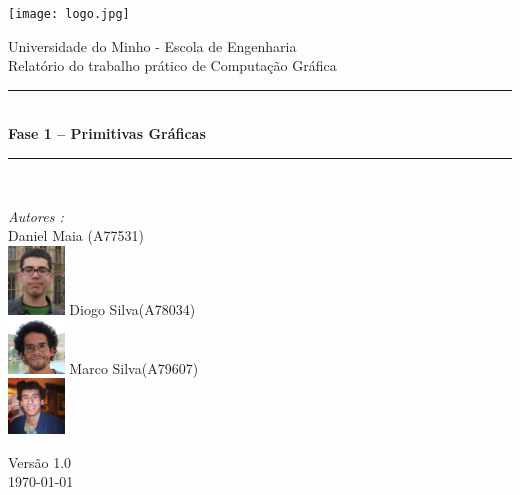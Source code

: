 \documentclass[a4paper]{article}
\begin{document}
\begin{titlepage}
\begin{center}


\texttt{[image: logo.jpg]}\\[0.5cm]

\vspace{10mm}

{\huge Universidade do Minho - Escola de Engenharia}\\[0.5cm]

{\large Relatório do trabalho prático de Computação Gráfica}\\[0.5cm]

\vspace{10mm} 

\rule{\linewidth}{0.5mm} \\[0.4cm]
{ \huge \bfseries Fase 1 – Primitivas Gráficas \\[0.4cm] }
\rule{\linewidth}{0.5mm} \\[1.5cm]

\noindent
\begin{minipage}{0.4\textwidth}
  \begin{flushleft} \large
    \emph{Autores :}\\
    Daniel Maia \textsc{(A77531)}\\
    \includegraphics[width=1.5cm]{./imagens/daniel.jpg}\break
    Diogo Silva\textsc{(A78034)}\\
    \includegraphics[width=1.5cm]{./imagens/afonso.jpg}\break
    Marco Silva\textsc{(A79607)}\\
    \includegraphics[width=1.5cm]{./imagens/marco.jpg}\break
  \end{flushleft}
\end{minipage}%
\vfill

{\large Versão 1.0 \\ \today}

\end{center}
\end{titlepage}
\end{document}
